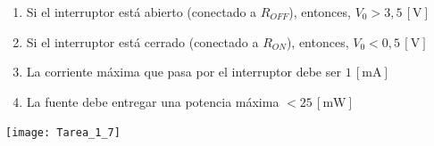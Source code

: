 \documentclass[
  11pt,
  letterpaper,
   addpoints,
  ]{exam}
\begin{document}
\begin{questions}
\begin{enumerate}
    \item Si el interruptor está abierto (conectado a $R_{OFF}$), entonces, $V_0 > 3{,}5\,\mathrm{[V]}$
    \item Si el interruptor está cerrado (conectado a $R_{ON}$), entonces, $V_0 < 0{,}5\,\mathrm{[V]}$
    \item La corriente máxima que pasa por el interruptor debe ser $1\,\mathrm{[mA]}$
    \item La fuente debe entregar una potencia máxima $< 25\,\mathrm{[mW]}$
\end{enumerate}
\begin{center}
    \texttt{[image: Tarea\_1\_7]}
\end{center}
\end{questions}
\end{document}
